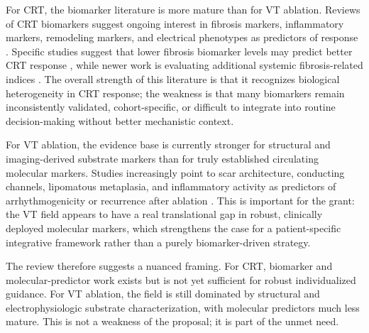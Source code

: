 For CRT, the biomarker literature is more mature than for VT ablation. Reviews of CRT biomarkers suggest ongoing interest in fibrosis markers, inflammatory markers, remodeling markers, and electrical phenotypes as predictors of response \cite{pmid31681965}. Specific studies suggest that lower fibrosis biomarker levels may predict better CRT response \cite{pmid30988339}, while newer work is evaluating additional systemic fibrosis-related indices \cite{pmid39101582}. The overall strength of this literature is that it recognizes biological heterogeneity in CRT response; the weakness is that many biomarkers remain inconsistently validated, cohort-specific, or difficult to integrate into routine decision-making without better mechanistic context.

For VT ablation, the evidence base is currently stronger for structural and imaging-derived substrate markers than for truly established circulating molecular markers. Studies increasingly point to scar architecture, conducting channels, lipomatous metaplasia, and inflammatory activity as predictors of arrhythmogenicity or recurrence after ablation \cite{pmid36607130,pmid38703163,pmid33004129,pmid37819047}. This is important for the grant: the VT field appears to have a real translational gap in robust, clinically deployed molecular markers, which strengthens the case for a patient-specific integrative framework rather than a purely biomarker-driven strategy.

The review therefore suggests a nuanced framing. For CRT, biomarker and molecular-predictor work exists but is not yet sufficient for robust individualized guidance. For VT ablation, the field is still dominated by structural and electrophysiologic substrate characterization, with molecular predictors much less mature. This is not a weakness of the proposal; it is part of the unmet need.

